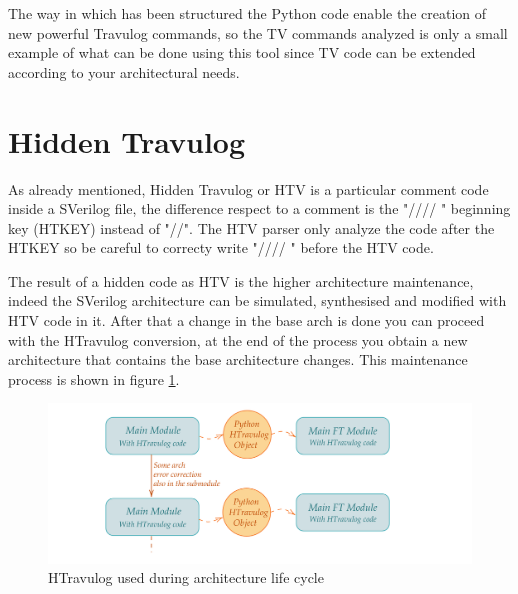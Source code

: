 {{{        }
    
    The way in which has been structured the Python code enable the creation of new powerful Travulog commands, so the TV commands analyzed is only a small example of what can be done using this tool since TV code can be extended according to your architectural needs. 
	}%

    \newpage
	\section{Hidden Travulog}{
	    \label{HTravulog}
        As already mentioned, Hidden Travulog or HTV is a particular comment code inside a SVerilog file, the difference respect to a comment is the "//// " beginning key (HTKEY) instead of "//". The HTV parser only analyze the code after the HTKEY so be careful to correcty write "//// " before the HTV code.
        
        The result of a hidden code as HTV is the higher architecture maintenance, indeed the SVerilog architecture can be simulated, synthesised and modified with HTV code in it. After that a change in the base arch is done you can proceed with the HTravulog conversion, at the end of the process you obtain a new architecture that contains the base architecture changes. This maintenance process is shown in figure \ref{fig:HtravulogCycle}.
		\begin{figure}[H]
			\centering
			\includegraphics[scale=0.2,center]{./images/HTravulogArchMaintenance.png}
			\caption{HTravulog used during architecture life cycle}
			\label{fig:HtravulogCycle}
		\end{figure} 
        
}}
